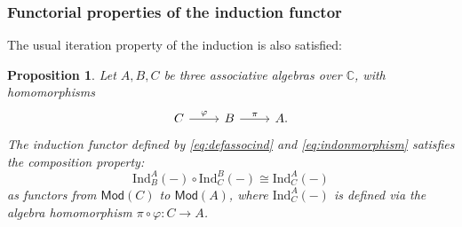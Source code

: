\documentclass[12pt,a4paper,reqno]{amsart}
\numberwithin{equation}{section}
\numberwithin{equation}{section}
\newtheorem{prop}[thm]{Proposition}
\theoremstyle{definition}
\def \ra {\rightarrow}
\def \C {\mathbb{C}}
\def\Ind{\mathrm{Ind}}
\def\Ind{\mathrm{Ind}}
\def\Mod{\mathsf{Mod}}
\begin{document}
	\subsubsection{Functorial properties of the induction functor} 
	The usual iteration property of the induction is also satisfied: 
	
	\begin{prop}\label{prop:iterationind}
		Let $A,B,C$ be three associative algebras over $\C$, with homomorphisms
		$$
		\begin{tikzcd}
			C\arrow[r,"\varphi"]& B\arrow[r,"\pi"]&A.
		\end{tikzcd}
		$$
		The induction functor defined by \eqref{eq:defassocind} and \eqref{eq:indonmorphism} satisfies the composition property: $$\Ind^A_B(-)\circ \Ind^B_C(-)\cong \Ind^A_C(-)$$
		as functors from $\Mod(C)$ to $\Mod(A)$, where $\Ind^A_C(-)$ is defined via the algebra homomorphism $\pi\circ \varphi: C\ra A$. 
	\end{prop}
\end{document}
